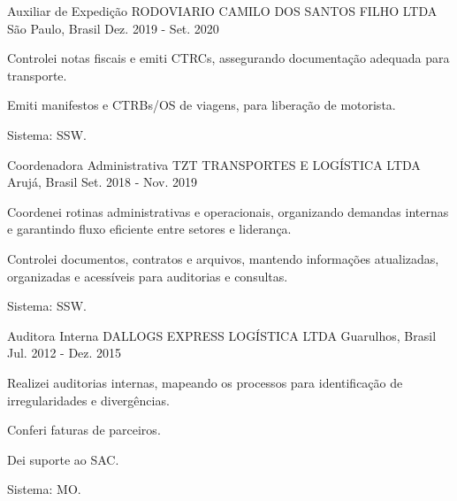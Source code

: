 \begin{cventries}
  \cventry
    {Auxiliar de Expedição} %
    {RODOVIARIO CAMILO DOS SANTOS FILHO LTDA} %
    {São Paulo, Brasil} %
    {Dez. 2019 - Set. 2020} %
    {
      \begin{cvitems} %
        \item {Controlei notas fiscais e emiti CTRCs, assegurando documentação adequada para transporte.}
        \item {Emiti manifestos e CTRBs/OS de viagens, para liberação de motorista.}
        \item {Sistema: SSW.}
      \end{cvitems}
    }
  \break

  \cventry
    {Coordenadora Administrativa} %
    {TZT TRANSPORTES E LOGÍSTICA LTDA} %
    {Arujá, Brasil} %
    {Set. 2018 - Nov. 2019} %
    {
      \begin{cvitems} %
        \item {Coordenei rotinas administrativas e operacionais, organizando demandas internas e garantindo fluxo eficiente entre setores e liderança.}
        \item {Controlei documentos, contratos e arquivos, mantendo informações atualizadas, organizadas e acessíveis para auditorias e consultas.}
        \item {Sistema: SSW.}
      \end{cvitems}
    }
  \break

  \cventry
    {Auditora Interna} %
    {DALLOGS EXPRESS LOGÍSTICA LTDA} %
    {Guarulhos, Brasil} %
    {Jul. 2012 - Dez. 2015} %
    {
      \begin{cvitems} %
        \item {Realizei auditorias internas, mapeando os processos para identificação de irregularidades e divergências.}
        \item {Conferi faturas de parceiros.}
        \item {Dei suporte ao SAC.}
        \item {Sistema: MO.}
      \end{cvitems}
    }
  \break


\end{cventries}
